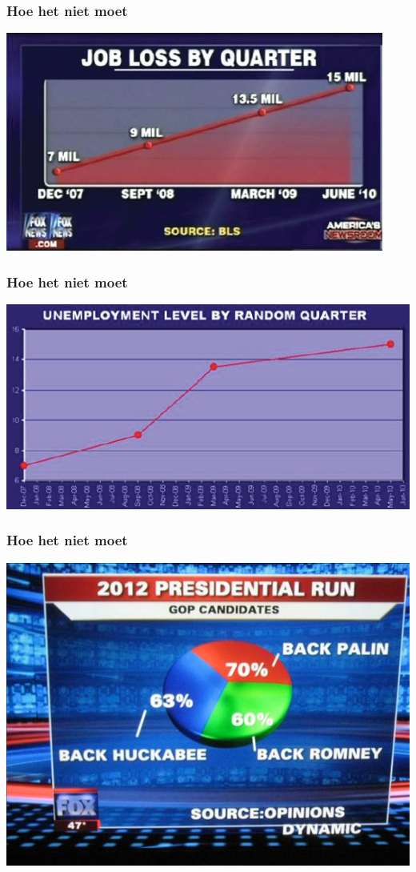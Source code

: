 \documentclass[aspectratio=169]{beamer}
\begin{document}
\begin{frame}
  \frametitle{Hoe het niet moet}
  
  \centering
  \includegraphics[height=.8\textheight]{img/intro-02.png}
\end{frame}

\begin{frame}
  \frametitle{Hoe het niet moet}
  
  \centering
  \includegraphics[height=.8\textheight]{img/intro-03.png}
\end{frame}

\begin{frame}
  \frametitle{Hoe het niet moet}

  \centering
  \includegraphics[height=.8\textheight]{img/intro-04.png}
\end{frame}
\end{document}
